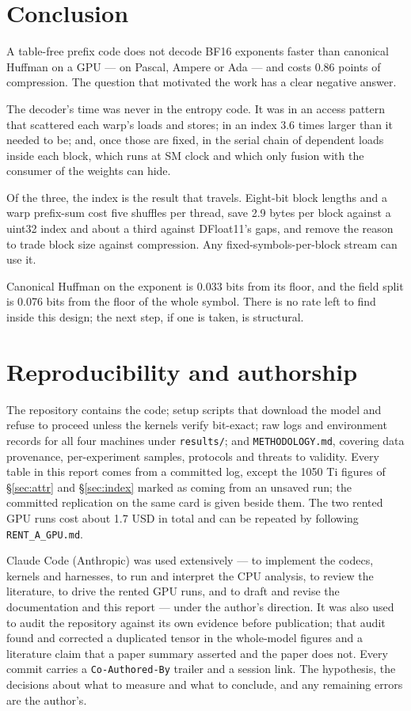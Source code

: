 \documentclass[11pt,a4paper]{article}
\newcommand{\code}[1]{\texttt{#1}}
\begin{document}
\section{Conclusion}

A table-free prefix code does not decode BF16 exponents faster than canonical Huffman on a GPU --- on Pascal, Ampere or Ada --- and costs 0.86 points of compression. The question that motivated the work has a clear negative answer.

The decoder's time was never in the entropy code. It was in an access pattern that scattered each warp's loads and stores; in an index 3.6 times larger than it needed to be; and, once those are fixed, in the serial chain of dependent loads inside each block, which runs at SM clock and which only fusion with the consumer of the weights can hide.

Of the three, the index is the result that travels. Eight-bit block lengths and a warp prefix-sum cost five shuffles per thread, save 2.9 bytes per block against a uint32 index and about a third against DFloat11's gaps, and remove the reason to trade block size against compression. Any fixed-symbols-per-block stream can use it.

Canonical Huffman on the exponent is 0.033 bits from its floor, and the field split is 0.076 bits from the floor of the whole symbol. There is no rate left to find inside this design; the next step, if one is taken, is structural.

\section*{Reproducibility and authorship}

The repository contains the code; setup scripts that download the model and refuse to proceed unless the kernels verify bit-exact; raw logs and environment records for all four machines under \code{results/}; and \code{METHODOLOGY.md}, covering data provenance, per-experiment samples, protocols and threats to validity. Every table in this report comes from a committed log, except the 1050 Ti figures of \S\ref{sec:attr} and \S\ref{sec:index} marked as coming from an unsaved run; the committed replication on the same card is given beside them. The two rented GPU runs cost about 1.7 USD in total and can be repeated by following \code{RENT\_A\_GPU.md}.

Claude Code (Anthropic) was used extensively --- to implement the codecs, kernels and harnesses, to run and interpret the CPU analysis, to review the literature, to drive the rented GPU runs, and to draft and revise the documentation and this report --- under the author's direction. It was also used to audit the repository against its own evidence before publication; that audit found and corrected a duplicated tensor in the whole-model figures and a literature claim that a paper summary asserted and the paper does not. Every commit carries a \code{Co-Authored-By} trailer and a session link. The hypothesis, the decisions about what to measure and what to conclude, and any remaining errors are the author's.
\end{document}

